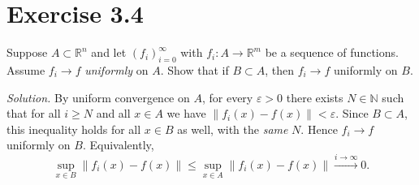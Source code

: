 \section*{Exercise 3.4}
Suppose $A\subset\mathbb{R}^n$ and let $(f_i)_{i=0}^\infty$ with $f_i:A\to\mathbb{R}^m$ be a sequence of functions.
Assume $f_i\to f$ \emph{uniformly} on $A$. Show that if $B\subset A$, then $f_i\to f$ uniformly on $B$.

\textit{Solution.} By uniform convergence on $A$, for every $\varepsilon>0$ there exists $N\in\mathbb{N}$ such that
for all $i\ge N$ and all $x\in A$ we have $\|f_i(x)-f(x)\|<\varepsilon$. Since $B\subset A$, this inequality holds
for all $x\in B$ as well, with the \emph{same} $N$. Hence $f_i\to f$ uniformly on $B$. Equivalently,
\[
\sup_{x\in B}\|f_i(x)-f(x)\|\le \sup_{x\in A}\|f_i(x)-f(x)\|\xrightarrow{i\to\infty} 0.
\]

